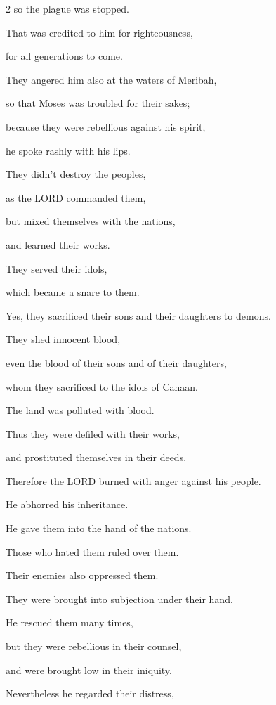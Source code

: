 \begin{multicols}{2}
	so the plague was stopped.
	
	
	\myverse{}That was credited to him for righteousness,
	
	for all generations to come.
	
	
	\myverse{}They angered him also at the waters of Meribah,
	
	so that Moses was troubled for their sakes;
	
	
	\myverse{}because they were rebellious against his spirit,
	
	he spoke rashly with his lips.
	
	
	\myverse{}They didn’t destroy the peoples,
	
	as the LORD commanded them,
	
	
	\myverse{}but mixed themselves with the nations,
	
	and learned their works.
	
	
	\myverse{}They served their idols,
	
	which became a snare to them.
	
	
	\myverse{}Yes, they sacrificed their sons and their daughters to demons.
	
	
	\myverse{}They shed innocent blood,
	
	even the blood of their sons and of their daughters,
	
	whom they sacrificed to the idols of Canaan.
	
	The land was polluted with blood.
	
	
	\myverse{}Thus they were defiled with their works,
	
	and prostituted themselves in their deeds.
	
	
	\myverse{}Therefore the LORD burned with anger against his people.
	
	He abhorred his inheritance.
	
	
	\myverse{}He gave them into the hand of the nations.
	
	Those who hated them ruled over them.
	
	
	\myverse{}Their enemies also oppressed them.
	
	They were brought into subjection under their hand.
	
	
	\myverse{}He rescued them many times,
	
	but they were rebellious in their counsel,
	
	and were brought low in their iniquity.
	
	
	\myverse{}Nevertheless he regarded their distress,
	

\end{multicols}
